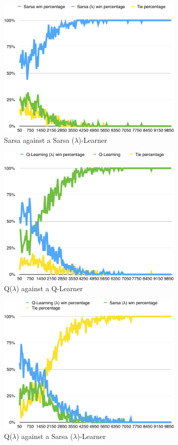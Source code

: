\documentclass{journal}
\begin{document}
\begin{figure}[h]
	\includegraphics[width=0.8\textwidth]{SVSL.pdf}
	\caption{Sarsa against a Sarsa ($\lambda{}$)-Learner}
\end{figure}
\begin{figure}[h]
	\includegraphics[width=0.8\textwidth]{QLVQ.pdf}
	\caption{Q($\lambda{}$) against a Q-Learner}
\end{figure}
\begin{figure}[h]
	\includegraphics[width=0.8\textwidth]{QLVSL.pdf}
	\caption{Q($\lambda{}$) against a Sarsa ($\lambda{}$)-Learner}
\end{figure}
\end{document}
